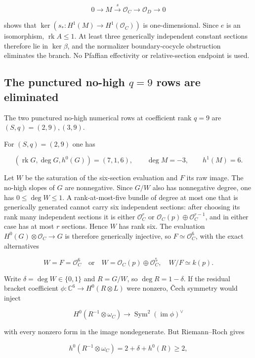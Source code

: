 \documentclass[11pt]{article}
\theoremstyle{definition}
\begin{document}
\[0\longrightarrow M\xrightarrow{s}\mathcal O_C
\longrightarrow\mathcal O_D\longrightarrow0\]

shows that \(\ker(s_*:H^1(M)\to H^1(\mathcal O_C))\) is one-dimensional.
Since \(e\) is an isomorphism, \(\operatorname{rk}A\le1\). At least
three generically independent constant sections therefore lie in
\(\ker\beta\), and the normalizer boundary-cocycle obstruction
eliminates the branch. No Pfaffian effectivity or relative-section
endpoint is used.

\subsection{\texorpdfstring{The punctured no-high \(q=9\) rows are
eliminated}{The punctured no-high q=9 rows are eliminated}}\label{the-punctured-no-high-q9-rows-are-eliminated}

The two punctured no-high numerical rows at coefficient rank \(q=9\) are
\((S,q)=(2,9),(3,9)\).

For \((S,q)=(2,9)\) one has

\[(\operatorname{rk}G,\deg G,h^0(G))=(7,1,6),
\qquad \deg M=-3,
\qquad h^1(M)=6.\]

Let \(W\) be the saturation of the six-section evaluation and \(F\) its
raw image. The no-high slopes of \(G\) are nonnegative. Since \(G/W\)
also has nonnegative degree, one has \(0\le\deg W\le1\). A
rank-at-most-five bundle of degree at most one that is generically
generated cannot carry six independent sections: after choosing its rank
many independent sections it is either \(\mathcal O_C^r\) or
\(\mathcal O_C(p)\oplus\mathcal O_C^{r-1}\), and in either case has at
most \(r\) sections. Hence \(W\) has rank six. The evaluation
\(H^0(G)\otimes\mathcal O_C\to G\) is therefore generically injective,
so \(F\simeq\mathcal O_C^6\), with the exact alternatives

\[W=F=\mathcal O_C^6
\quad\text{or}\quad
W=\mathcal O_C(p)\oplus\mathcal O_C^5,
\quad W/F\simeq k(p).\]

Write \(\delta=\deg W\in\{0,1\}\) and \(R=G/W\), so \(\deg R=1-\delta\).
If the residual bracket coefficient
\(\phi:\mathbb C^6\to H^0(R\otimes L)\) were nonzero, \v{C}ech symmetry
would inject

\[H^0(R^{-1}\otimes\omega_C)
\longrightarrow\operatorname{Sym}^2(\operatorname{im}\phi)^\vee\]

with every nonzero form in the image nondegenerate. But Riemann--Roch
gives

\[h^0(R^{-1}\otimes\omega_C)
=2+\delta+h^0(R)\ge2,\]
\end{document}
